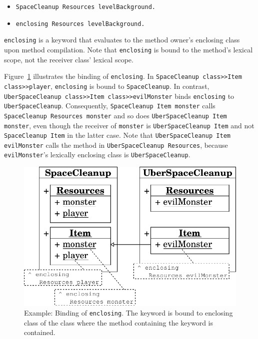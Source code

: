 \begin{itemize}
	\item \texttt{SpaceCleanup Resources levelBackground.}
	\item \texttt{enclosing Resources levelBackground.}
\end{itemize}

\texttt{enclosing} is a keyword that evaluates to the method owner's enclosing class upon method compilation. Note that \texttt{enclosing} is bound to the method's lexical scope, not the receiver class' lexical scope.

Figure~\ref{fig:concept_lexical_thisouter} illustrates the binding of \texttt{enclosing}. In \texttt{SpaceCleanup class>>Item class>>player}, \texttt{enclosing} is bound to \texttt{SpaceCleanup}. In contrast, \texttt{UberSpaceClean\-up class>>Item class>>evilMonster} binds \texttt{enclosing} to \texttt{UberSpaceCleanup}. Consequently, \texttt{SpaceCleanup Item monster} calls \texttt{SpaceCleanup Resources monster} and so does \texttt{UberSpaceCleanup Item monster}, even though the receiver of \texttt{monster} is \texttt{UberSpaceCleanup Item} and not \texttt{SpaceCleanup Item} in the latter case. Note that \texttt{UberSpaceCleanup Item evilMonster} calls the method in \texttt{UberSpaceCleanup Resources}, because \texttt{evilMonster}'s lexically enclosing class is \texttt{UberSpaceCleanup}.

\begin{figure}[!htp]
	\includegraphics[scale=0.75]{nested_lexical1.pdf}
	\centering
	\caption[Example: Binding of \texttt{enclosing}]{Example: Binding of \texttt{enclosing}. The keyword is bound to enclosing class of the class where the method containing the keyword is contained.}
	\label{fig:concept_lexical_thisouter}
\end{figure}

